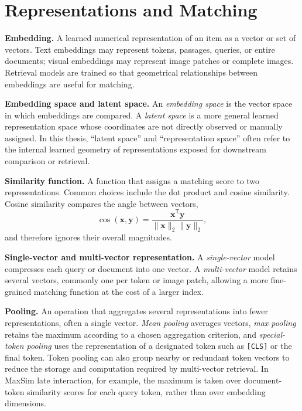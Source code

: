 \section*{Representations and Matching}

\noindent\textbf{Embedding.}
A learned numerical representation of an item as a vector or set of vectors.
Text embeddings may represent tokens, passages, queries, or entire documents;
visual embeddings may represent image patches or complete images. Retrieval
models are trained so that geometrical relationships between embeddings are
useful for matching.

\noindent\textbf{Embedding space and latent space.}
An \emph{embedding space} is the vector space in which embeddings are compared.
A \emph{latent space} is a more general learned representation space whose
coordinates are not directly observed or manually assigned. In this thesis,
``latent space'' and ``representation space'' often refer to the internal
learned geometry of representations exposed for downstream comparison or retrieval.

\noindent\textbf{Similarity function.}
A function that assigns a matching score to two representations. Common choices
include the dot product and cosine similarity. Cosine similarity compares the
angle between vectors,
\[
  \cos(\mathbf{x},\mathbf{y})
  =
  \frac{\mathbf{x}^{\mathsf{T}}\mathbf{y}}
       {\lVert\mathbf{x}\rVert_2\lVert\mathbf{y}\rVert_2},
\]
and therefore ignores their overall magnitudes.

\noindent\textbf{Single-vector and multi-vector representation.}
A \emph{single-vector} model compresses each query or document into one vector.
A \emph{multi-vector} model retains several vectors, commonly one per token or
image patch, allowing a more fine-grained matching function at the cost of a
larger index.

\noindent\textbf{Pooling.}
An operation that aggregates several representations into fewer
representations, often a single vector. \emph{Mean pooling} averages vectors,
\emph{max pooling} retains the maximum according to a chosen aggregation
criterion, and
\emph{special-token pooling} uses the representation of a designated token such
as \texttt{[CLS]} or the final token. Token pooling can also group nearby or
redundant token vectors to reduce the storage and computation required by
multi-vector retrieval. In MaxSim late interaction, for example, the maximum is
taken over document-token similarity scores for each query token, rather than
over embedding dimensions.

